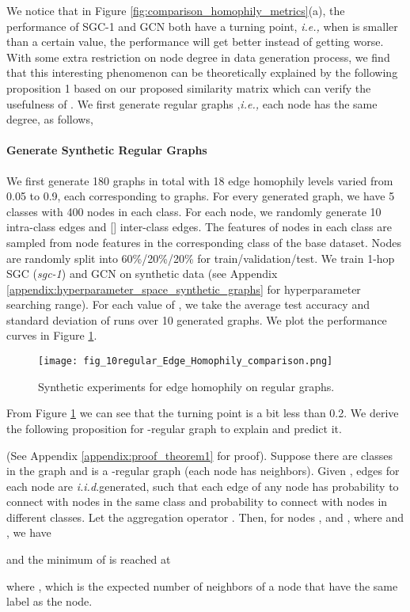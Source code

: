 \documentclass{article}
\newcommand\ie{\textit{i.e.,}}
\newcommand\iid{\textit{i.i.d.}}
\newcommand{\0}{{\boldsymbol{0}}}
\newcommand{\6}{{\partial}}
\newcommand{\8}{{\infty}}
\newcommand{\4}{{\nabla}}
\newenvironment{proposition}[2][Proposition]{\begin{trivlist}
		\item[\hskip \labelsep {\bfseries #1}\hskip \labelsep {\bfseries #2.}]}{\end{trivlist}}
\begin{document}
We notice that in Figure \ref{fig:comparison_homophily_metrics}(a), the performance of SGC-1 and GCN both have a turning point, \ie{} when  is smaller than a certain value, the performance will get better instead of getting worse. With some extra restriction on node degree in data generation process, we find that this interesting phenomenon can be theoretically explained by the following proposition 1 based on our proposed similarity matrix which can verify the usefulness of . We first generate regular graphs ,\ie{} each node has the same degree, as follows,

\paragraph{Generate Synthetic Regular Graphs} We first generate 180 graphs in total with 18 edge homophily levels varied from 0.05 to 0.9, each corresponding to  graphs. For every generated graph, we have 5 classes with 400 nodes in each class. For each node, we randomly generate 10 intra-class edges and [] inter-class edges. The features of nodes in each class are sampled from node features in the corresponding class of the base dataset. Nodes are randomly split into 60\%/20\%/20\% for train/validation/test. We train 1-hop SGC (\textit{sgc-1}) \cite{wu2019simplifying} and GCN \cite{kipf2016classification} on synthetic data  (see Appendix \ref{appendix:hyperparameter_space_synthetic_graphs} for hyperparameter searching range). For each value of , we take the average test accuracy and standard deviation of runs over 10 generated graphs.  We plot the performance curves in Figure \ref{fig:synthetic_regular_graphs}.
\begin{figure}[h]
     {
     \captionsetup{justification = centering}
     \texttt{[image: fig\_10regular\_Edge\_Homophily\_comparison.png]}
     }
     \caption{Synthetic experiments for edge homophily on regular graphs.}
     \label{fig:synthetic_regular_graphs}
\end{figure}

From Figure \ref{fig:synthetic_regular_graphs} we can see that the turning point is a bit less than 0.2. We derive the following proposition for -regular graph to explain and predict it.

\begin{proposition} 1
(See Appendix \ref{appendix:proof_theorem1} for proof). Suppose there are  classes in the graph  and  is a -regular graph (each node has  neighbors). Given , edges for each node are \iid generated, such that each edge of any node has probability  to connect with nodes in the same class and probability  to connect with nodes in different classes. Let the aggregation operator . Then, for nodes ,  and , where  and , we have

and the minimum of  is reached at 

where , which is the expected number of neighbors of a node that have the same label as the node.
\end{proposition}
\end{document}
